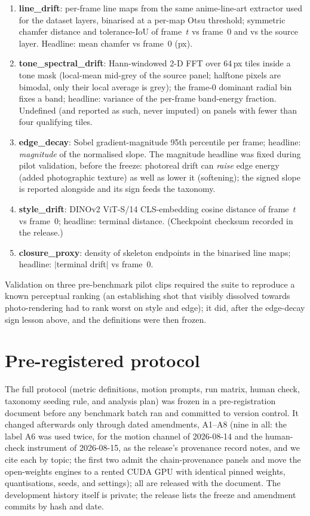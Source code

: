 \documentclass[11pt]{article}
\begin{document}
\begin{enumerate}
\item \textbf{line\_drift}: per-frame line maps from the same
  anime-line-art extractor used for the dataset layers, binarised at a per-map
  Otsu threshold; symmetric chamfer distance and tolerance-IoU of frame~$t$ vs
  frame~0 and vs the source layer. Headline: mean chamfer vs frame~0 (px).
\item \textbf{tone\_spectral\_drift}: Hann-windowed 2-D FFT over 64\,px
  tiles inside a tone mask (local-mean mid-grey of the source panel; halftone
  pixels are bimodal, only their local average is grey); the frame-0
  dominant radial bin fixes a band; headline: variance of the per-frame
  band-energy fraction. Undefined (and reported as such, never imputed) on
  panels with fewer than four qualifying tiles.
\item \textbf{edge\_decay}: Sobel gradient-magnitude 95th percentile per
  frame; headline: \emph{magnitude} of the normalised slope. The magnitude
  headline was fixed during pilot validation, before the freeze: photoreal
  drift can \emph{raise} edge energy (added photographic texture) as well as
  lower it (softening); the signed slope is reported alongside and its sign
  feeds the taxonomy.
\item \textbf{style\_drift}: DINOv2 ViT-S/14 CLS-embedding cosine
  distance of frame~$t$ vs frame~0; headline: terminal distance. (Checkpoint
  checksum recorded in the release.)
\item \textbf{closure\_proxy}: density of skeleton endpoints in the
  binarised line maps; headline: $|$terminal drift$|$ vs frame~0.
\end{enumerate}

Validation on three pre-benchmark pilot clips required the suite to
reproduce a known perceptual ranking (an establishing shot that visibly
dissolved towards photo-rendering had to rank worst on style and edge); it
did, after the edge-decay sign lesson above, and the definitions were then
frozen.

\section{Pre-registered protocol}
\label{sec:protocol}

The full protocol (metric definitions, motion prompts, run matrix, human
check, taxonomy seeding rule, and analysis plan) was frozen in a
pre-registration document before any benchmark batch ran and committed to
version control. It changed afterwards only through dated amendments, A1--A8 (nine in all:
the label A6 was used twice, for the motion channel of 2026-08-14 and the
human-check instrument of 2026-08-15, as the release's provenance record
notes, and we cite each by topic; the first two admit the chain-provenance panels and move the open-weights
engines to a rented CUDA GPU with identical pinned weights, quantisations,
seeds, and settings); all are released with the document. The development
history itself is private; the release lists the freeze and amendment
commits by hash and date.
\end{document}
